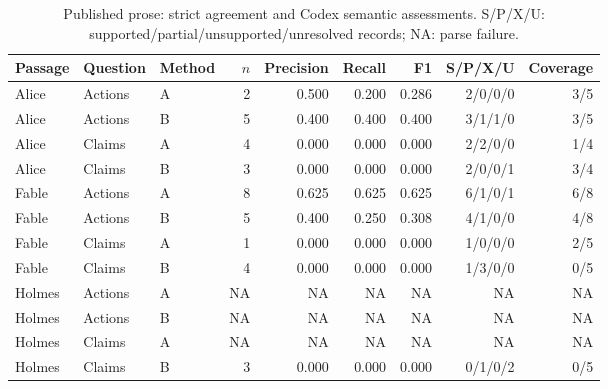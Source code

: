 \begin{table}[t]
\vspace*{6pt}
\caption{Published prose: strict agreement and Codex semantic assessments. S/P/X/U: supported/partial/unsupported/unresolved records; NA: parse failure.}\label{tab:prose}
\centering\small\begin{tabular}{lllrrrrrr}\toprule
Passage & Question & Method & $n$ & Precision & Recall & F1 & S/P/X/U & Coverage\\\midrule
Alice & Actions & A & 2 & 0.500 & 0.200 & 0.286 & 2/0/0/0 & 3/5 \\
Alice & Actions & B & 5 & 0.400 & 0.400 & 0.400 & 3/1/1/0 & 3/5 \\
Alice & Claims & A & 4 & 0.000 & 0.000 & 0.000 & 2/2/0/0 & 1/4 \\
Alice & Claims & B & 3 & 0.000 & 0.000 & 0.000 & 2/0/0/1 & 3/4 \\
Fable & Actions & A & 8 & 0.625 & 0.625 & 0.625 & 6/1/0/1 & 6/8 \\
Fable & Actions & B & 5 & 0.400 & 0.250 & 0.308 & 4/1/0/0 & 4/8 \\
Fable & Claims & A & 1 & 0.000 & 0.000 & 0.000 & 1/0/0/0 & 2/5 \\
Fable & Claims & B & 4 & 0.000 & 0.000 & 0.000 & 1/3/0/0 & 0/5 \\
Holmes & Actions & A & NA & NA & NA & NA & NA & NA \\
Holmes & Actions & B & NA & NA & NA & NA & NA & NA \\
Holmes & Claims & A & NA & NA & NA & NA & NA & NA \\
Holmes & Claims & B & 3 & 0.000 & 0.000 & 0.000 & 0/1/0/2 & 0/5 \\\bottomrule\end{tabular}\end{table}
